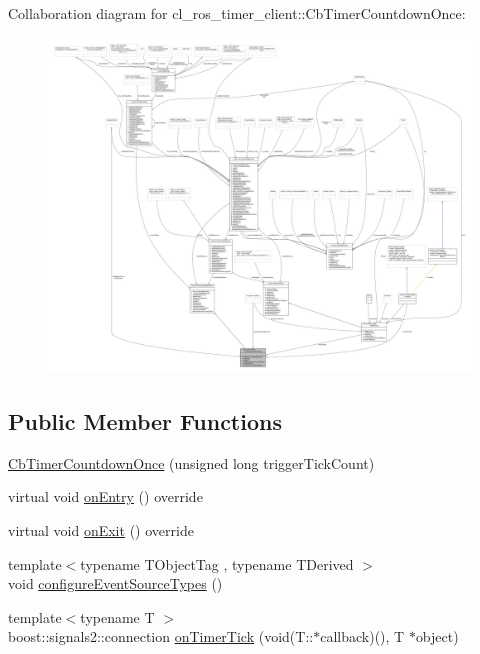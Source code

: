 Collaboration diagram for cl\+\_\+ros\+\_\+timer\+\_\+client\+:\+:Cb\+Timer\+Countdown\+Once\+:
\nopagebreak
\begin{figure}[H]
\begin{center}
\leavevmode
\includegraphics[width=350pt]{classcl__ros__timer__client_1_1CbTimerCountdownOnce__coll__graph}
\end{center}
\end{figure}
\subsection*{Public Member Functions}
\begin{DoxyCompactItemize}
\item 
\hyperlink{classcl__ros__timer__client_1_1CbTimerCountdownOnce_a8134aa670f714ff9803f9f3e233b7d8c}{Cb\+Timer\+Countdown\+Once} (unsigned long trigger\+Tick\+Count)
\item 
virtual void \hyperlink{classcl__ros__timer__client_1_1CbTimerCountdownOnce_a885987578a087b38a5dca4e6b903c1d3}{on\+Entry} () override
\item 
virtual void \hyperlink{classcl__ros__timer__client_1_1CbTimerCountdownOnce_ae4f0157f61deb1812aa94388101902f6}{on\+Exit} () override
\item 
{\footnotesize template$<$typename T\+Object\+Tag , typename T\+Derived $>$ }\\void \hyperlink{classcl__ros__timer__client_1_1CbTimerCountdownOnce_acabb512a398b115b04450cb061d6defc}{configure\+Event\+Source\+Types} ()
\item 
{\footnotesize template$<$typename T $>$ }\\boost\+::signals2\+::connection \hyperlink{classcl__ros__timer__client_1_1CbTimerCountdownOnce_a87f58c4bbad1e638eb0fef3e815ecb13}{on\+Timer\+Tick} (void(T\+::$\ast$callback)(), T $\ast$object)
\end{DoxyCompactItemize}
